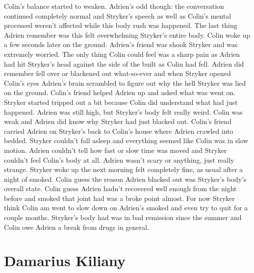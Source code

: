 \documentclass[12pt]{book}
\begin{document}
Colin's balance started to weaken. Adrien's odd though: the conversation continued completely normal and Stryker's speech as well as Colin's mental processed weren't affected while this body rush was happened. The last thing Adrien remember was this felt overwhelming Stryker's entire body. Colin woke up a few seconds later on the ground. Adrien's friend was shook Stryker and was extremely worried. The only thing Colin could feel was a sharp pain as Adrien had hit Stryker's head against the side of the built as Colin had fell. Adrien did remember fell over or blackened out what-so-ever and when Stryker opened Colin's eyes Adrien's brain scrambled to figure out why the hell Stryker was lied on the ground. Colin's friend helped Adrien up and asked what was went on. Stryker started tripped out a bit because Colin did understand what had just happened. Adrien was still high, but Stryker's body felt really weird. Colin was weak and Adrien did know why Stryker had just blacked out. Colin's friend carried Adrien on Stryker's back to Colin's house where Adrien crawled into bedded. Stryker couldn't fall asleep and everything seemed like Colin was in slow motion. Adrien couldn't tell how fast or slow time was moved and Stryker couldn't feel Colin's body at all. Adrien wasn't scary or anything, just really strange. Stryker woke up the next morning felt completely fine, as usual after a night of smoked. Colin guess the reason Adrien blacked out was Stryker's body's overall state. Colin guess Adrien hadn't recovered well enough from the night before and smoked that joint had was a broke point almost. For now Stryker think Colin am went to slow down on Adrien's smoked and even try to quit for a couple months. Stryker's body had was in bad remission since the summer and Colin owe Adrien a break from drugs in general.



\chapter{Damarius Kiliany}
\end{document}

